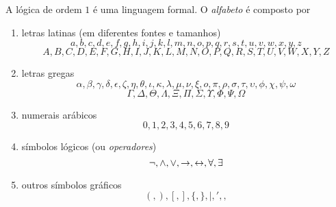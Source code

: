 A lógica de ordem $1$ é uma linguagem formal. O \emph{alfabeto} é composto por
	\begin{enumerate}
	\item letras latinas (em diferentes fontes e tamanhos)
	\begin{equation*}
	a, b, c, d, e, f, g, h, i, j, k, l, m, n, o, p, q, r, s, t, u, v, w, x, y, z
	\end{equation*}
	\begin{equation*}
	A, B, C, D, E, F, G, H, I, J, K, L, M, N, O, P, Q, R, S, T, U, V, W, X, Y, Z
	\end{equation*}

	\item letras gregas
		\begin{equation*}
	\alpha,\beta,\gamma,\delta,\epsilon,\zeta,\eta,\theta,\iota,\kappa,\lambda,\mu,\nu,\xi,o,\pi,\rho,\sigma,\tau,\upsilon,\phi,\chi,\psi,\omega
	\end{equation*}
	\begin{equation*}
	\Gamma, \Delta, \Theta, \Lambda, \Xi, \Pi, \Sigma, \Upsilon, \Phi, \Psi, \Omega
	\end{equation*}

	\item numerais arábicos
	\begin{equation*}
	0, 1, 2, 3, 4, 5, 6, 7, 8, 9
	\end{equation*}

	\item símbolos lógicos (ou \emph{operadores})
	\begin{equation*}
	 \lnot, \land, \lor, \rightarrow, \leftrightarrow, \forall, \exists
	 \end{equation*}

	\item outros símbolos gráficos
	\begin{equation*}
	(, ), [, ], \{, \}, |, ', ,
	\end{equation*}
	\end{enumerate}

